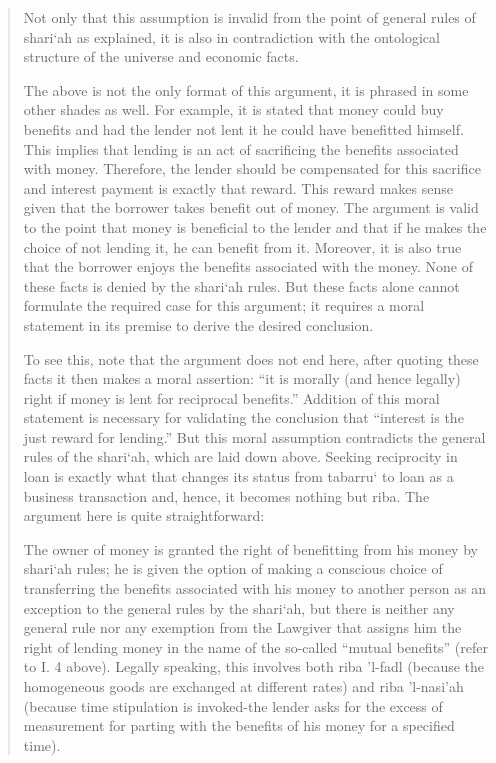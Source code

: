 \begin{quote}
Not only that this assumption is invalid from the point of general rules of shari‘ah as explained, it is also in contradiction with the ontological structure of the universe and economic facts.

The above is not the only format of this argument, it is phrased in some other shades as well. For example, it is stated that money could buy benefits and had the lender not lent it he could have benefitted himself. This implies that lending is an act of sacrificing the benefits associated with money. Therefore, the lender should be compensated for this sacrifice and interest payment is exactly that reward. This reward makes sense given that the borrower takes benefit out of money. The argument is valid to the point that money is beneficial to the lender and that if he makes the choice of not lending it, he can benefit from it. Moreover, it is also true that the borrower enjoys the benefits associated with the money. None of these facts is denied by the shari‘ah rules. But these facts alone cannot formulate the required case for this argument; it requires a moral statement in its premise to derive the desired conclusion.

To see this, note that the argument does not end here, after quoting these facts it then makes a moral assertion: “it is morally (and hence legally) right if money is lent for reciprocal benefits.” Addition of this moral statement is necessary for validating the conclusion that “interest is the just reward for lending.” But this moral assumption contradicts the general rules of the shari‘ah, which are laid down above. Seeking reciprocity in loan is exactly what that changes its status from tabarru‘ to loan as a business transaction and, hence, it becomes nothing but riba. The argument here is quite straightforward:

The owner of money is granted the right of benefitting from his money by shari‘ah rules; he is given the option of making a conscious choice of transferring the benefits associated with his money to another person as an exception to the general rules by the shari‘ah, but there is neither any general rule nor any exemption from the Lawgiver that assigns him the right of lending money in the name of the so-called “mutual benefits” (refer to I. 4 above). Legally speaking, this involves both riba 'l-fadl (because the homogeneous goods are exchanged at different rates) and riba 'l-nasi'ah (because time stipulation is invoked-the lender asks for the excess of measurement for parting with the benefits of his money for a specified time).


\end{quote}
